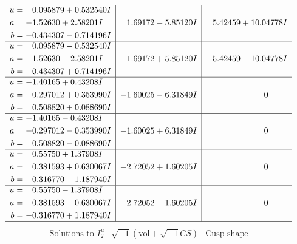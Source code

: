 \documentclass[1p]{elsarticle_modified}
\theoremstyle{definition}
\newcommand{\I}{\sqrt{-1}}
\begin{document}
$$\begin{array}{c|c|c}
\begin{aligned}
u &= \phantom{-}0.095879 + 0.532540 I \\
a &= -1.52630 + 2.58201 I \\
b &= -0.434307 - 0.714196 I\end{aligned}
 & \phantom{-}1.69172 - 5.85120 I & \phantom{-}5.42459 + 10.04778 I \\ \hline\begin{aligned}
u &= \phantom{-}0.095879 - 0.532540 I \\
a &= -1.52630 - 2.58201 I \\
b &= -0.434307 + 0.714196 I\end{aligned}
 & \phantom{-}1.69172 + 5.85120 I & \phantom{-}5.42459 - 10.04778 I \\ \hline\begin{aligned}
u &= -1.40165 + 0.43208 I \\
a &= -0.297012 + 0.353990 I \\
b &= \phantom{-}0.508820 + 0.088690 I\end{aligned}
 & -1.60025 - 6.31849 I & \phantom{-0.000000 } 0 \\ \hline\begin{aligned}
u &= -1.40165 - 0.43208 I \\
a &= -0.297012 - 0.353990 I \\
b &= \phantom{-}0.508820 - 0.088690 I\end{aligned}
 & -1.60025 + 6.31849 I & \phantom{-0.000000 } 0 \\ \hline\begin{aligned}
u &= \phantom{-}0.55750 + 1.37908 I \\
a &= \phantom{-}0.381593 + 0.630067 I \\
b &= -0.316770 - 1.187940 I\end{aligned}
 & -2.72052 + 1.60205 I & \phantom{-0.000000 } 0 \\ \hline\begin{aligned}
u &= \phantom{-}0.55750 - 1.37908 I \\
a &= \phantom{-}0.381593 - 0.630067 I \\
b &= -0.316770 + 1.187940 I\end{aligned}
 & -2.72052 - 1.60205 I & \phantom{-0.000000 } 0\\
 \hline 
 \end{array}$$\newpage$$\begin{array}{c|c|c}  
\text{Solutions to }I^u_{2}& \I (\text{vol} + \sqrt{-1}CS) & \text{Cusp shape}\\
 \hline 
\begin{aligned}

\end{aligned}
\end{array}$$
\end{document}
